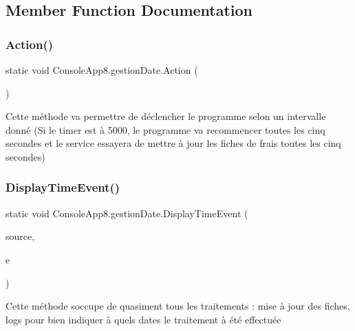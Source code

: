 \subsection{Member Function Documentation}
\mbox{\label{class_console_app8_1_1gestion_date_aba8ed79a00d7ee8bbb7af0b0be68a2ca}} 
\subsubsection{\texorpdfstring{Action()}{Action()}}
{\footnotesize\ttfamily static void Console\+App8.\+gestion\+Date.\+Action (\begin{DoxyParamCaption}{ }\end{DoxyParamCaption})\hspace{0.3cm}{\ttfamily [static]}}

Cette méthode va permettre de déclencher le programme selon un intervalle donné (Si le timer est à 5000, le programme va recommencer toutes les cinq secondes et le service essayera de mettre à jour les fiches de frais toutes les cinq secondes) \mbox{\label{class_console_app8_1_1gestion_date_add2c0b76c8380ff81b55fb4c8e2949ec}} 
\subsubsection{\texorpdfstring{Display\+Time\+Event()}{DisplayTimeEvent()}}
{\footnotesize\ttfamily static void Console\+App8.\+gestion\+Date.\+Display\+Time\+Event (\begin{DoxyParamCaption}\item[{object}]{source,  }\item[{Elapsed\+Event\+Args}]{e }\end{DoxyParamCaption})\hspace{0.3cm}{\ttfamily [static]}}

Cette méthode s\textquotesingle{}occupe de quasiment tous les traitements \+: mise à jour des fiches, logs pour bien indiquer à quels dates le traitement à été effectuée \mbox{\label{class_console_app8_1_1gestion_date_afa35b030b6e2aab20ffd13b0fc7b10b3}} 

